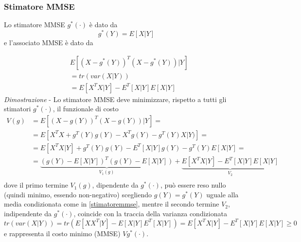 \subsubsection{Stimatore MMSE}
Lo stimatore MMSE $g^*(\cdot)$ è dato da 
\begin{equation}
\label{stimatoremmse}
g^*(Y)=E[X|Y]
\end{equation}
e l’associato MMSE è dato da

\begin{equation}
\begin{split}
&E[(X-g^*(Y))^T(X-g^*(Y))|Y]\\
&=tr(var(X|Y)) \\
&=E[X^TX|Y]-E^T[X|Y]E[X|Y]
\end{split}
\end{equation}
\textit{Dimostrazione} - Lo stimatore MMSE deve minimizzare, rispetto a tutti gli stimatori $g^*(\cdot)$, il funzionale di costo\\
\begin{equation}
\begin{split}
V(g)&=E[(X-g(Y))^T(X-g(Y))|Y]= \\
&=E[X^TX+g^T(Y)g(Y)-X^Tg(Y)-g^T(Y)X|Y)]= \\
&=E[X^TX|Y]+g^T(Y)g(Y)-E^T[X|Y]g(Y)-g^T(Y)E[X|Y]=\\
&=\underbrace{(g(Y)-E[X|Y])^T(g(Y)-E[X|Y])}_{V_1(g)}+\underbrace{E[X^TX|Y]-E^T[X|Y]E[X|Y]}_{V_2}\\
\end{split}
\end{equation}
dove il primo termine $V_1(g)$, dipendente da $g^*(\cdot)$, può essere reso nullo (quindi minimo, essendo non-negativo) scegliendo $g(Y)=g^*(Y)$ uguale alla media condizionata come in \eqref{stimatoremmse}, mentre il secondo termine $V_2$, indipendente da $g^*(\cdot)$, coincide con la traccia della varianza condizionata $tr(var(X|Y))=tr(E[XX^T|Y]-E[X|Y]E^T[X|Y])=E[X^TX|Y]-E^T[X|Y]E[X|Y]\ge 0 $ e rappresenta il costo minimo (MMSE) $Vg^*(\cdot)$.\\

